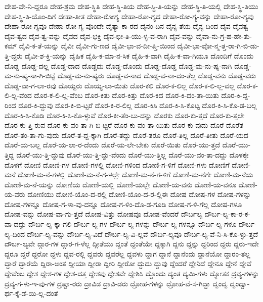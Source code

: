 {ದೇಹ-ವೇ-ನಿ-ದ್ದರೂ
ದೇಹ-ಶ್ರಮ
ದೇಹ-ಸ್ಥಿತಿ
ದೇಹ-ಸ್ಥಿ-ತಿಯ
ದೇಹ-ಸ್ಥಿ-ತಿ-ಯನ್ನು
ದೇಹ-ಸ್ಥಿ-ತಿ-ಯಲ್ಲಿ
ದೇಹ-ಸ್ಥಿ-ತಿಯು
ದೇಹ-ಸ್ಥಿ-ತಿ-ಯೊಂ-ದಿಗೆ
ದೇಹಾ-ತೀತ
ದೇಹಾ-ರೋಗ್ಯ
ದೇಹಾ-ರೋ-ಗ್ಯದ
ದೇಹಾ-ರೋ-ಗ್ಯ-ವನ್ನು
ದೇಹಾ-ರೋ-ಗ್ಯವು
ದೇಹಾ-ರೋ-ಗ್ಯವೂ
ದೇಹಾ-ರೋ-ಗ್ಯ-ವೊಂದೇ
ದೈತ್ಯಾ-ಕಾ-ರದ
ದೈನಂ-ದಿನ
ದೈನ್ಯ-ತೆಯ
ದೈನ್ಯ-ದಿಂದ
ದೈವ
ದೈವತ್ವ
ದೈವ-ತ್ವದ
ದೈವ-ತ್ವ-ವನ್ನು
ದೈವದ
ದೈವ-ಭಕ್ತಿ
ದೈವ-ಭೀ-ತಿ-ಯು-ಳ್ಳ-ವ-ರಾಗಿ
ದೈವ-ವನ್ನು
ದೈವಾ-ನು-ಗ್ರ-ಹ-ಹೇ-ತು-ಕಮ್
ದೈವಿ-ಕ-ತೆ-ಯನ್ನು
ದೈವೀ
ದೈವೀ-ಗು-ಣದ
ದೈವೀ-ಭಾ-ವ-ದೀ-ಪ್ತಿ-ಯಿಂದ
ದೈವೀ-ಭಾ-ವೋ-ನ್ಮ-ತ್ತ-ರಾ-ಗಿ-ಬಿ-ಡು-ತ್ತಿ-ದ್ದರು
ದೈವೀ-ಶ-ಕ್ತಿ-ಯನ್ನು
ದೈಹಿಕ
ದೈಹಿ-ಕ-ಮಾ-ನ-ಸಿಕ
ದೈಹಿ-ಕ-ವಾಗಿ
ದೈಹಿ-ಕ-ವಾ-ಗಿಯೂ
ದೊಂದಿಗೆ
ದೊಂದು
ದೊಡ್ಡ
ದೊಡ್ಡ-ದಲ್ಲ
ದೊಡ್ಡ-ದಾದ
ದೊಡ್ಡದು
ದೊಡ್ಡ-ದೊಂದು
ದೊಡ್ಡ-ದೊಡ್ಡ
ದೊಡ್ಡ-ಮ-ನು-ಷ್ಯ-ನಾಗಿ
ದೊಡ್ಡ-ಮ-ನು-ಷ್ಯ-ನಾ-ಗಿ-ಬಿಟ್ಟೆ
ದೊಡ್ಡ-ಮ-ನು-ಷ್ಯರು
ದೊಡ್ಡ-ವ-ನಾದ
ದೊಡ್ಡ-ವ-ನಾ-ದಂ-ತೆಲ್ಲ
ದೊಡ್ಡ-ವನು
ದೊಡ್ಡ-ವರು
ದೊಡ್ಡ-ವಾ-ಗ-ಲಾ-ರವು
ದೊಯ್ದರು
ದೊಯ್ಯ-ಲಾ-ಯಿತು
ದೊರ-ಕಲಿ
ದೊರ-ಕ-ಲಿಲ್ಲ
ದೊರ-ಕ-ಲಿ-ಲ್ಲ-ವಲ್ಲ
ದೊರ-ಕ-ಲಿ-ಲ್ಲ-ವೆಂದ
ದೊರ-ಕ-ಲಿ-ಲ್ಲ-ವೆಂಬ
ದೊರ-ಕಿತು
ದೊರ-ಕಿತ್ತು
ದೊರ-ಕಿದ
ದೊರ-ಕಿ-ದಂ-ತಾ-ಯಿತು
ದೊರ-ಕಿ-ದ್ದ-ರಿಂದ
ದೊರ-ಕಿ-ದ್ದುವು
ದೊರ-ಕಿ-ಬಿ-ಟ್ಟರೆ
ದೊರ-ಕಿ-ರ-ಲಿಲ್ಲ
ದೊರ-ಕಿಸಿ
ದೊರ-ಕಿ-ಸಿ-ಕೊಟ್ಟ
ದೊರ-ಕಿ-ಸಿ-ಕೊ-ಡ-ಬಲ್ಲ
ದೊರ-ಕಿ-ಸಿ-ಕೊಡಿ
ದೊರ-ಕಿ-ಸಿ-ಕೊ-ಳ್ಳುವೆ
ದೊರ-ಕೀ-ತೆಂ-ಬು-ದನ್ನು
ದೊರಕು
ದೊರ-ಕು-ತ್ತದೆ
ದೊರ-ಕು-ತ್ತಲೇ
ದೊರ-ಕು-ತ್ತಿ-ರುವ
ದೊರ-ಕು-ವಂ-ತಾ-ಗಿ-ಬಿ-ಟ್ಟರೆ
ದೊರ-ಕು-ವಂ-ತಾ-ಯಿತು
ದೊರ-ಕು-ವುದು
ದೊರೆ
ದೊರೆತ
ದೊರೆ-ತಂ-ತಾ-ಗು-ವುದು
ದೊರೆ-ತ-ದ್ದ-ಕ್ಕಾಗಿ
ದೊರೆ-ತದ್ದು
ದೊರೆ-ತರೂ
ದೊರೆ-ತಿಲ್ಲ
ದೊರೆ-ತೀತು
ದೊರೆ-ಯದ
ದೊರೆ-ಯ-ಬಲ್ಲ
ದೊರೆ-ಯ-ಲಾ-ರ-ದೆಂದು
ದೊರೆ-ಯ-ಲೇ-ಬೇಕು
ದೊರೆ-ಯಿತು
ದೊರೆ-ಯು-ತ್ತದೆ
ದೊರೆ-ಯು-ತ್ತಿದ್ದ
ದೊರೆ-ಯು-ತ್ತಿ-ದ್ದುವು
ದೊರೆ-ಯು-ತ್ತಿ-ದ್ದು-ವೆಂದು
ದೊರೆ-ಯು-ತ್ತಿಲ್ಲ
ದೊರೆ-ಯು-ವಂ-ತಾ-ದದ್ದು
ದೊಳಕ್ಕೇ
ದೊಳಗೆ
ದೋಣಿ
ದೋಣಿ-ಗಳ
ದೋಣಿ-ಗಳಲ್ಲಿ
ದೋಣಿ-ಗಳಿಂದ
ದೋಣಿ-ಗ-ಳಿಗೆ
ದೋಣಿ-ಗಳು
ದೋಣಿಗೆ
ದೋಣಿ-ಮನೆ
ದೋಣಿ-ಮ-ನೆ-ಗಳಲ್ಲಿ
ದೋಣಿ-ಮ-ನೆ-ಗ-ಳಲ್ಲೇ
ದೋಣಿ-ಮ-ನೆ-ಗ-ಳಿಗೆ
ದೋಣಿ-ಮ-ನೆಗೇ
ದೋಣಿ-ಮ-ನೆಯ
ದೋಣಿ-ಮ-ನೆ-ಯನ್ನು
ದೋಣಿಯ
ದೋಣಿ-ಯಲ್ಲಿ
ದೋಣಿ-ಯಲ್ಲೇ
ದೋಣಿ-ಯ-ವನು
ದೋಣಿ-ಯ-ವನೂ
ದೋಣಿ-ಯ-ವರು
ದೋಣಿಯು
ದೋಣಿ-ಯೊಂ-ದ-ರಲ್ಲಿ
ದೋಣಿ-ಯೊಂ-ದ-ರ-ಲ್ಲಿಈ
ದೋಷ
ದೋಷ-ಗಳ
ದೋಷ-ಗಳನ್ನು
ದೋಷ-ಗಳನ್ನೂ
ದೋಷ-ಗ-ಳಾ-ವು-ದನ್ನೂ
ದೋಷ-ಗ-ಳಿಂ-ದೊ-ಡ-ಗೂಡಿ
ದೋಷ-ಗ-ಳಿ-ಗೆಲ್ಲ
ದೋಷ-ಗಳೂ
ದೋಷ-ವನ್ನು
ದೋಷ-ವಾ-ಗು-ತ್ತದೆ
ದೋಷ-ವಿತ್ತು
ದೋಷವೂ
ದೋಷ-ವೆಂದರೆ
ದೌರ್ಬಲ್ಯ
ದೌರ್ಬ-ಲ್ಯ-ಕಾ-ರ-ಕ-ವಾ-ದದ್ದು
ದೌರ್ಬ-ಲ್ಯ-ಕ್ಕಾ-ಗಲಿ
ದೌರ್ಬ-ಲ್ಯ-ಗಳ
ದೌರ್ಬ-ಲ್ಯ-ಗಳನ್ನು
ದೌರ್ಬ-ಲ್ಯ-ಗಳನ್ನೂ
ದೌರ್ಬ-ಲ್ಯ-ಗಳೂ
ದೌರ್ಬ-ಲ್ಯ-ದಿಂದ
ದೌರ್ಬ-ಲ್ಯ-ವನ್ನು
ದೌರ್ಬ-ಲ್ಯ-ವಿದೆ
ದೌರ್ಬ-ಲ್ಯ-ವಿ-ಲ್ಲವೆ
ದೌರ್ಬ-ಲ್ಯವೂ
ದೌರ್ಬ-ಲ್ಯ-ವೆ-ನಿ-ಸಿ-ಕೊ-ಳ್ಳು-ತ್ತದೆ
ದೌರ್ಬ-ಲ್ಯವೇ
ದ್ಗಾರ-ಗಳ
ದ್ಗಾರ-ಗ-ಳೆಲ್ಲ
ದ್ಗೀತೆಯು
ದ್ದಂತೆ
ದ್ದಂತೆಯೇ
ದ್ದಕ್ಕಾಗಿ
ದ್ದನು
ದ್ದನ್ನು
ದ್ದರಿಂದ
ದ್ದರು
ದ್ದರು-ಇದೇ
ದ್ದರೂ
ದ್ದರೆ
ದ್ದರೋ
ದ್ದಳು
ದ್ದವ-ರಲ್ಲಿ
ದ್ದವರು
ದ್ದವರೆಲ್ಲ
ದ್ದವಳು
ದ್ದಾಗ
ದ್ದಾನೆ
ದ್ದಾನೆಂದು
ದ್ದಾನೆಯೋ
ದ್ದಾರಂ-ತಲ್ಲ
ದ್ದಾರೆ
ದ್ದಾರೆಯೆ
ದ್ದಿರಾ-ಅಂತ
ದ್ದೀಯಾ
ದ್ದೀರಾ
ದ್ದೀರಿ
ದ್ದೀರೋ
ದ್ದುದು
ದ್ದುವು
ದ್ದೆಂದರೆ
ದ್ದೇನಿದೆ
ದ್ದೇನೂ
ದ್ದೇನೆ
ದ್ದೇವೆ
ದ್ದೇವೆಂಬ
ದ್ದೇಶ
ದ್ದೇಶ-ಗಳ
ದ್ದೇಶ-ದತ್ತ
ದ್ದೇಶವು
ದ್ದೇಶವೇ
ದ್ದೇಶಿಸಿ
ದ್ದೊಂದು
ದ್ಯಂತ
ದ್ಯಮಿ-ಗಳು
ದ್ಯೋತಕ
ದ್ರವ್ಯ-ಗಳನ್ನು
ದ್ರವ್ಯ-ಗ-ಳು-ಇ-ವು-ಗಳ
ದ್ರಷ್ಟಾ-ರರು
ದ್ರಾವಿಡ
ದ್ರಾವಿ-ಡರು
ದ್ರೋಹ-ಗಳನ್ನು
ದ್ರೋಹ-ವೆ-ಸ-ಗಿದ್ದಾ
ದ್ವಂದ್ವ
ದ್ವಂದ್ವಾ-ರ್ಥ-ಕ್ಕೆ-ಡೆ-ಯಿ-ಲ್ಲ-ದಂತೆ
}
